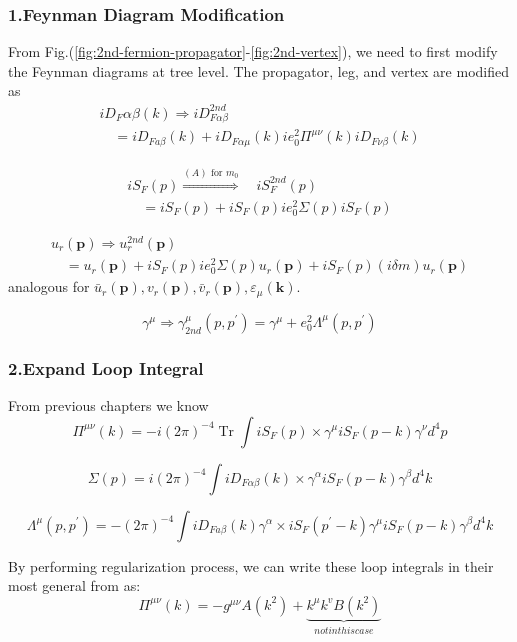 \subsubsection{1.Feynman Diagram Modification}
From Fig.(\ref{fig:2nd-fermion-propagator}-\ref{fig:2nd-vertex}), we need to first modify the Feynman diagrams at tree level. The propagator, leg, and vertex are modified as
$$\begin{array}{l}
i D_{F} \alpha \beta(k) \Rightarrow i D_{F \alpha \beta}^{2 n d} \\
\quad=i D_{F a \beta}(k)+i D_{F \alpha \mu}(k) i e_{0}^{2} \Pi^{\mu \nu}(k)iD_{F\nu\beta}(k)
\end{array}$$

$$\begin{array}{l}
i S_{F}(p) \stackrel{(A) \text { for } m_{0}}{\Rightarrow} \quad i S_{F}^{2 n d}(p) \\
\quad=i S_{F}(p)+i S_{F}(p) i e_{0}^{2} \Sigma(p) i S_{F}(p)
\end{array}$$

$$\begin{array}{l}
u_{r}(\mathbf{p}) \Rightarrow u_{r}^{2 n d}(\mathbf{p}) \\
\quad=u_{r}(\mathbf{p})+i S_{F}(p) i e_{0}^{2} \Sigma(p) u_{r}(\mathbf{p})+i S_{F}(p)(i\delta m)u_r(\mathbf{p})
\end{array}$$
analogous for $\bar{u}_{r}(\mathbf{p}), v_{r}(\mathbf{p}), \bar{v}_{r}(\mathbf{p}), \varepsilon_{\mu}(\mathbf{k})$.

$$\gamma^{\mu} \Rightarrow \gamma_{2 n d}^{\mu}\left(p, p^{\prime}\right)=\gamma^{\mu}+e_{0}^{2} \Lambda^{\mu}\left(p, p^{\prime}\right)$$

\subsubsection{2.Expand Loop Integral}
From previous chapters we know
$$
\Pi^{\mu\nu}(k)=-i(2 \pi)^{-4} \operatorname{Tr} \int i S_{F}(p) \times \gamma^{\mu} i S_{F}(p-k) \gamma^{\nu} d^{4} p
$$

$$\Sigma(p)=i(2 \pi)^{-4} \int i D_{F \alpha \beta}(k) \times\gamma^{\alpha} i S_{F}(p-k) \gamma^{\beta} d^{4} k$$

$$
\Lambda^{\mu}\left(p, p^{\prime}\right)=-(2 \pi)^{-4} \int i D_{F a \beta}(k) \gamma^{\alpha} \times i S_{F}\left(p^{\prime}-k\right) \gamma^{\mu} i S_{F}(p-k) \gamma^{\beta} d^{4} k
$$

By performing regularization process, we can write these loop integrals in their most general from as:
$$\Pi^{\mu\nu}(k)=-g^{\mu \nu} A\left(k^{2}\right)+\underbrace{k^{\mu} k^{v} B\left(k^{2}\right)}_{not in this case}$$


